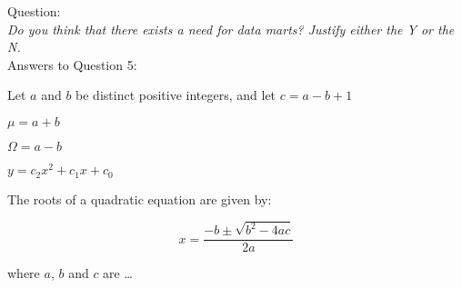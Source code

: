 Question:\\
\emph{
    Do you think that there exists a need for data marts? Justify either the Y or the N.
}\\

Answers to Question 5:

Let $a$ and $b$ be distinct positive integers, and let $c = a - b + 1$

$\mu = a + b $


$\Omega = a - b $

$y = c_2 x^2 + c_1 x + c_0 $

The roots of a quadratic equation are given by:

\begin{equation}
x = \frac{-b \pm \sqrt{b^2 - 4ac}} {2a}
\end{equation}

where $a$, $b$ and $c$ are \ldots
